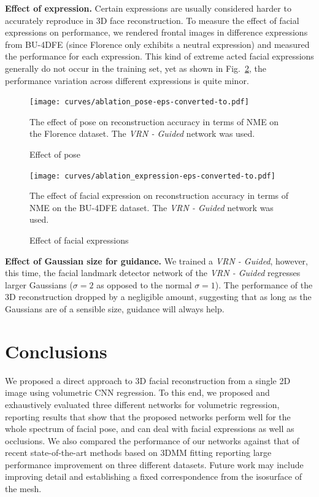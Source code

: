 \textbf{Effect of expression.} Certain expressions are usually considered harder to accurately reproduce in 3D face
reconstruction. To measure the effect of facial expressions on performance, we rendered frontal images in difference expressions from BU-4DFE (since Florence only
exhibits a neutral expression) and measured the performance for each expression. This kind of extreme acted facial
expressions generally do not occur in the training set, yet as shown in Fig.~\ref{fig:effect_expression}, the performance variation across different expressions is quite minor.

\begin{figure}
\centering
  \texttt{[image: curves/ablation\_pose-eps-converted-to.pdf]}
  \caption{Effect of pose}{The effect of pose on reconstruction
    accuracy in terms of NME on the Florence dataset. The \textit{VRN
      - Guided} network was used.}
  \label{fig:effect_pose}
\end{figure}



\begin{figure}
  \centering
  \texttt{[image: curves/ablation\_expression-eps-converted-to.pdf]}
  \caption{Effect of facial expressions}{The effect of facial
    expression on reconstruction accuracy in terms of NME on the
    BU-4DFE dataset. The \textit{VRN - Guided} network was used.}
  \label{fig:effect_expression}
\end{figure}

\textbf{Effect of Gaussian size for guidance.} We trained a
\textit{VRN - Guided}, however, this time, the facial landmark
detector network of the \textit{VRN - Guided} regresses larger
Gaussians ($\sigma = 2$ as opposed to the normal $\sigma = 1$). The
performance of the 3D reconstruction dropped by a negligible amount,
suggesting that as long as the Gaussians are of a sensible size,
guidance will always help.



\section{Conclusions}

We proposed a direct approach to 3D facial reconstruction from a
single 2D image using volumetric CNN regression. To this end, we
proposed and exhaustively evaluated three different networks for
volumetric regression, reporting results that show that the proposed
networks perform well for the whole spectrum of facial pose, and can
deal with facial expressions as well as occlusions. We also compared
the performance of our networks against that of recent
state-of-the-art methods based on 3DMM fitting reporting large
performance improvement on three different datasets.
Future work may include improving detail and establishing a fixed correspondence from the isosurface of the mesh.


